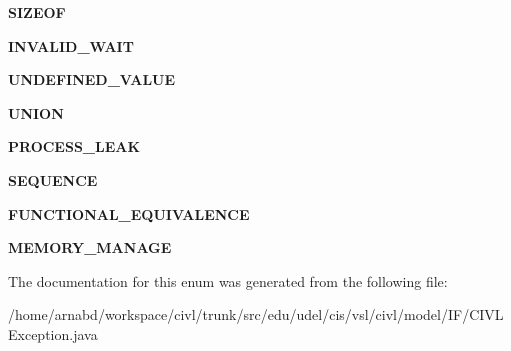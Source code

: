 \begin{DoxyCompactItemize}
\item 
\hypertarget{enumedu_1_1udel_1_1cis_1_1vsl_1_1civl_1_1model_1_1IF_1_1CIVLException_1_1ErrorKind_ae9004bcb9ad9bc291a6e80bb97f5ff9c}{}{\bfseries S\+I\+Z\+E\+O\+F}\label{enumedu_1_1udel_1_1cis_1_1vsl_1_1civl_1_1model_1_1IF_1_1CIVLException_1_1ErrorKind_ae9004bcb9ad9bc291a6e80bb97f5ff9c}

\item 
\hypertarget{enumedu_1_1udel_1_1cis_1_1vsl_1_1civl_1_1model_1_1IF_1_1CIVLException_1_1ErrorKind_ae983a4dc788d869a10633dc9bf34b97d}{}{\bfseries I\+N\+V\+A\+L\+I\+D\+\_\+\+W\+A\+I\+T}\label{enumedu_1_1udel_1_1cis_1_1vsl_1_1civl_1_1model_1_1IF_1_1CIVLException_1_1ErrorKind_ae983a4dc788d869a10633dc9bf34b97d}

\item 
\hypertarget{enumedu_1_1udel_1_1cis_1_1vsl_1_1civl_1_1model_1_1IF_1_1CIVLException_1_1ErrorKind_a6d4102a235373abc322cbb2c119034f2}{}{\bfseries U\+N\+D\+E\+F\+I\+N\+E\+D\+\_\+\+V\+A\+L\+U\+E}\label{enumedu_1_1udel_1_1cis_1_1vsl_1_1civl_1_1model_1_1IF_1_1CIVLException_1_1ErrorKind_a6d4102a235373abc322cbb2c119034f2}

\item 
\hypertarget{enumedu_1_1udel_1_1cis_1_1vsl_1_1civl_1_1model_1_1IF_1_1CIVLException_1_1ErrorKind_add7d8b296a47643395eb599ba0b6e2d0}{}{\bfseries U\+N\+I\+O\+N}\label{enumedu_1_1udel_1_1cis_1_1vsl_1_1civl_1_1model_1_1IF_1_1CIVLException_1_1ErrorKind_add7d8b296a47643395eb599ba0b6e2d0}

\item 
\hypertarget{enumedu_1_1udel_1_1cis_1_1vsl_1_1civl_1_1model_1_1IF_1_1CIVLException_1_1ErrorKind_ad3c5f9fda97c0a05b184c95ee52e5dd5}{}{\bfseries P\+R\+O\+C\+E\+S\+S\+\_\+\+L\+E\+A\+K}\label{enumedu_1_1udel_1_1cis_1_1vsl_1_1civl_1_1model_1_1IF_1_1CIVLException_1_1ErrorKind_ad3c5f9fda97c0a05b184c95ee52e5dd5}

\item 
\hypertarget{enumedu_1_1udel_1_1cis_1_1vsl_1_1civl_1_1model_1_1IF_1_1CIVLException_1_1ErrorKind_aa4c5936726a0e95b1e0b60f1d73e2f08}{}{\bfseries S\+E\+Q\+U\+E\+N\+C\+E}\label{enumedu_1_1udel_1_1cis_1_1vsl_1_1civl_1_1model_1_1IF_1_1CIVLException_1_1ErrorKind_aa4c5936726a0e95b1e0b60f1d73e2f08}

\item 
\hypertarget{enumedu_1_1udel_1_1cis_1_1vsl_1_1civl_1_1model_1_1IF_1_1CIVLException_1_1ErrorKind_a7e3c03c716a74ccbbf41d252e21009f0}{}{\bfseries F\+U\+N\+C\+T\+I\+O\+N\+A\+L\+\_\+\+E\+Q\+U\+I\+V\+A\+L\+E\+N\+C\+E}\label{enumedu_1_1udel_1_1cis_1_1vsl_1_1civl_1_1model_1_1IF_1_1CIVLException_1_1ErrorKind_a7e3c03c716a74ccbbf41d252e21009f0}

\item 
\hypertarget{enumedu_1_1udel_1_1cis_1_1vsl_1_1civl_1_1model_1_1IF_1_1CIVLException_1_1ErrorKind_aa37483cb5f47242d0479184be6532ff6}{}{\bfseries M\+E\+M\+O\+R\+Y\+\_\+\+M\+A\+N\+A\+G\+E}\label{enumedu_1_1udel_1_1cis_1_1vsl_1_1civl_1_1model_1_1IF_1_1CIVLException_1_1ErrorKind_aa37483cb5f47242d0479184be6532ff6}

\end{DoxyCompactItemize}


The documentation for this enum was generated from the following file\+:\begin{DoxyCompactItemize}
\item 
/home/arnabd/workspace/civl/trunk/src/edu/udel/cis/vsl/civl/model/\+I\+F/C\+I\+V\+L\+Exception.\+java\end{DoxyCompactItemize}
